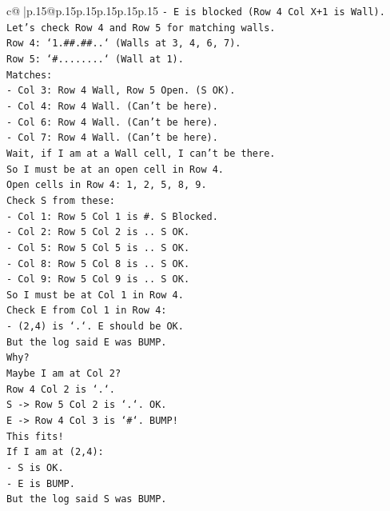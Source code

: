\documentclass{article}
\begin{document}
{\begin{supertabular}{c@{$\;$}|p{.15\linewidth}@{}p{.15\linewidth}p{.15\linewidth}p{.15\linewidth}p{.15\linewidth}p{.15\linewidth}}
{{{\texttt{{-} E is blocked (Row 4 Col X+1 is Wall).} \\
\texttt{Let's check Row 4 and Row 5 for matching walls.} \\
\texttt{Row 4: `1.\#\#.\#\#..` (Walls at 3, 4, 6, 7).} \\
\texttt{Row 5: `\#........` (Wall at 1).} \\
\texttt{Matches:} \\
\texttt{{-} Col 3: Row 4 Wall, Row 5 Open. (S OK).} \\
\texttt{{-} Col 4: Row 4 Wall. (Can't be here).} \\
\texttt{{-} Col 6: Row 4 Wall. (Can't be here).} \\
\texttt{{-} Col 7: Row 4 Wall. (Can't be here).} \\
\texttt{Wait, if I am at a Wall cell, I can't be there.} \\
\texttt{So I must be at an open cell in Row 4.} \\
\texttt{Open cells in Row 4: 1, 2, 5, 8, 9.} \\
\texttt{Check S from these:} \\
\texttt{{-} Col 1: Row 5 Col 1 is \#. S Blocked.} \\
\texttt{{-} Col 2: Row 5 Col 2 is .. S OK.} \\
\texttt{{-} Col 5: Row 5 Col 5 is .. S OK.} \\
\texttt{{-} Col 8: Row 5 Col 8 is .. S OK.} \\
\texttt{{-} Col 9: Row 5 Col 9 is .. S OK.} \\
\texttt{So I must be at Col 1 in Row 4.} \\
\texttt{Check E from Col 1 in Row 4:} \\
\texttt{{-} (2,4) is `.`. E should be OK.} \\
\texttt{But the log said E was BUMP.} \\
\texttt{Why?} \\
\texttt{Maybe I am at Col 2?} \\
\texttt{Row 4 Col 2 is `.`.} \\
\texttt{S {-}> Row 5 Col 2 is `.`. OK.} \\
\texttt{E {-}> Row 4 Col 3 is `\#`. BUMP!} \\
\texttt{This fits!} \\
\texttt{If I am at (2,4):} \\
\texttt{{-} S is OK.} \\
\texttt{{-} E is BUMP.} \\
\texttt{But the log said S was BUMP.} \\
}}}
\end{supertabular}}
\end{document}
